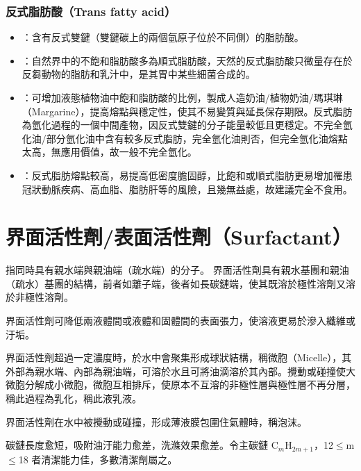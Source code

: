 \documentclass[a4paper,12pt]{report}
\begin{document}
\begin{itemize}
\begin{itemize}
\subsubsection{反式脂肪酸（Trans fatty acid）}
\begin{itemize}
\item {}：含有反式雙鍵（雙鍵碳上的兩個氫原子位於不同側）的脂肪酸。
\item {}：自然界中的不飽和脂肪酸多為順式脂肪酸，天然的反式脂肪酸只微量存在於反芻動物的脂肪和乳汁中，是其胃中某些細菌合成的。
\item {}：可增加液態植物油中飽和脂肪酸的比例，製成人造奶油/植物奶油/瑪琪琳（Margarine），提高熔點與穩定性，使其不易變質與延長保存期限。反式脂肪為氫化過程的一個中間產物，因反式雙鍵的分子能量較低且更穩定。不完全氫化油/部分氫化油中含有較多反式脂肪，完全氫化油則否，但完全氫化油熔點太高，無應用價值，故一般不完全氫化。
\item {}：反式脂肪熔點較高，易提高低密度膽固醇，比飽和或順式脂肪更易增加罹患冠狀動脈疾病、高血脂、脂肪肝等的風險，且幾無益處，故建議完全不食用。
\end{itemize}


\section{界面活性劑/表面活性劑（Surfactant）}
指同時具有親水端與親油端（疏水端）的分子。
界面活性劑具有親水基團和親油（疏水）基團的結構，前者如離子端，後者如長碳鏈端，使其既溶於極性溶劑又溶於非極性溶劑。

界面活性劑可降低兩液體間或液體和固體間的表面張力，使溶液更易於滲入纖維或汙垢。

界面活性劑超過一定濃度時，於水中會聚集形成球狀結構，稱微胞（Micelle），其外部為親水端、內部為親油端，可溶於水且可將油滴溶於其內部。攪動或碰撞使大微胞分解成小微胞，微胞互相排斥，使原本不互溶的非極性層與極性層不再分層，稱此過程為乳化，稱此液乳液。

界面活性劑在水中被攪動或碰撞，形成薄液膜包圍住氣體時，稱泡沫。

碳鏈長度愈短，吸附油汙能力愈差，洗滌效果愈差。令主碳鏈 C$_m$H$_{2m+1}$，12$\leq$m$\leq$18 者清潔能力佳，多數清潔劑屬之。


\end{itemize}
\end{itemize}
\end{document}
